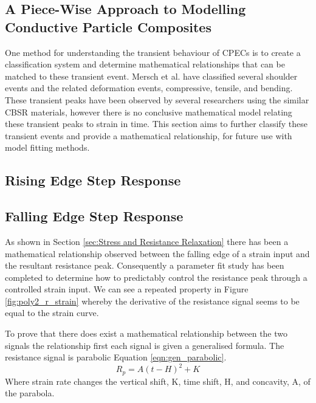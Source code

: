 \subsection{A Piece-Wise Approach to Modelling Conductive Particle Composites}
One method for understanding the transient behaviour of CPECs is to create a classification system and determine mathematical relationships that can be matched to these transient event. Mersch et al. have classified several shoulder events and the related deformation events, compressive, tensile, and bending. These transient peaks have been observed by several researchers using the similar CBSR materials, however there is no conclusive mathematical model relating these transient peaks to strain in time. This section aims to further classify these transient events and provide a mathematical relationship, for future use with model fitting methods.


\subsection{Rising Edge Step Response}


\subsection{Falling Edge Step Response}
As shown in Section \ref{sec:Stress and Resistance Relaxation} there has been a mathematical relationship observed between the falling edge of a strain input and the resultant resistance peak. Consequently a parameter fit study has been completed to determine how to predictably control the resistance peak through a controlled strain input. We can see a repeated property in Figure \ref{fig:poly2_r_strain} whereby the derivative of the resistance signal seems to be equal to the strain curve. 

To prove that there does exist a mathematical relationship between the two signals the relationship first each signal is given a generalised formula. The resistance signal is parabolic Equation \ref{eqn:gen_parabolic}. 
\begin{equation}
	R_p = A(t-H)^2 + K
	\label{eqn:gen_parabolic}
\end{equation}
Where strain rate changes the vertical shift, K, time shift, H, and concavity, A, of the parabola. 

